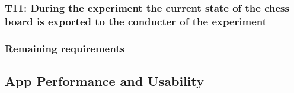 \newpage\subsubsection*{T11: During the experiment the current state of the chess board is exported to the conducter of the experiment}



\subsubsection*{Remaining requirements}






\subsection{App Performance and Usability}
